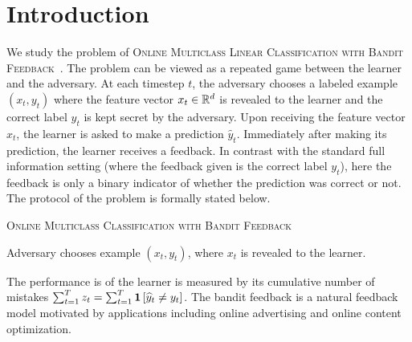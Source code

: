 \section{Introduction}
\label{section:introduction}

We study the problem of \textsc{Online Multiclass Linear Classification with
Bandit Feedback}~\citep{Kakade-Shalev-Shwartz-Tewari-2008}. The problem can be
viewed as a repeated game between the learner and the adversary. At each timestep $t$,
the adversary chooses a labeled example $(x_t, y_t)$ where the feature vector $x_t \in
\mathbb{R}^d$ is revealed to the learner and the correct label $y_t$ is kept secret by
the adversary. Upon receiving the feature vector $x_t$, the learner is asked to
make a prediction $\widehat{y}_t$. Immediately after making its prediction, the
learner receives a feedback. In contrast with the standard full information
setting (where the feedback given is the correct label $y_t$), here the feedback
is only a binary indicator of whether the prediction was correct or not. The
protocol of the problem is formally stated below.

\begin{protocol}[h]
\caption{\textsc{Online Multiclass Classification with Bandit Feedback}
\label{algorithm:game-protocol}}
\begin{algorithmic}[1]
{
\STATE Adversary chooses example $(x_t, y_t)$, where $x_t$ is revealed to the learner.
\ENDFOR
}
\end{algorithmic}
\end{protocol}

The performance is of the learner is measured by its cumulative number of
mistakes $\sum_{t=1}^T z_t = \sum_{t=1}^T \mathbf{1}\left[\widehat y_t \neq y_t \right]$.
The bandit feedback is a natural feedback model motivated by applications
including online advertising and online content optimization.

